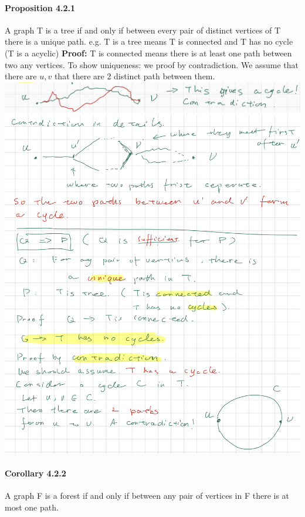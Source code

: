 \documentclass{article}
\begin{document}
\paragraph{Proposition 4.2.1}
A graph T is a tree if and only if between every pair of distinct vertices of T there is a unique path.\newline
e.g. T is a tree means T is connected and T has no cycle (T is a acyclic)\newline
\textbf{Proof:}\newline
T is connected means there is at least one path between two any vertices.\newline
To show uniqueness:\newline
we proof by contradiction.\newline
We assume that there are $u,v$ that there are 2 distinct path between them.\newline
\includegraphics{0059}\newline
\includegraphics{0060}
\paragraph{Corollary 4.2.2}
A graph F is a forest if and only if between any pair of vertices in F there is at most one path.\newline
\end{document}
